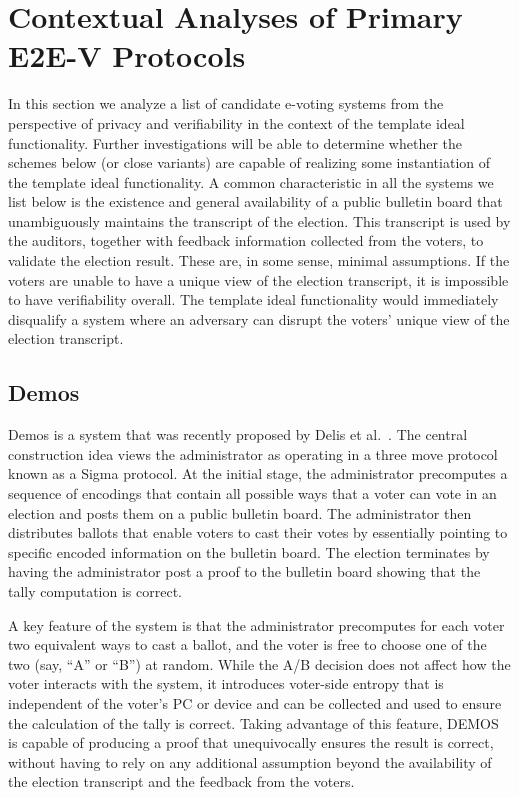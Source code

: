 \section{Contextual Analyses of Primary E2E-V Protocols}

In this section we analyze a list of candidate e-voting systems from
the perspective of privacy and verifiability in the context of the
template ideal functionality. Further investigations will be able to
determine whether the schemes below (or close variants) are capable of
realizing some instantiation of the template ideal functionality. A
common characteristic in all the systems we list below is the
existence and general availability of a public bulletin board that
unambiguously maintains the transcript of the election. This
transcript is used by the auditors, together with feedback information
collected from the voters, to validate the election result. These are,
in some sense, minimal assumptions. If the voters are unable to have a
unique view of the election transcript, it is impossible to have
verifiability overall. The template ideal functionality would
immediately disqualify a system where an adversary can disrupt the
voters' unique view of the election transcript.

\subsection{Demos}

Demos is a system that was recently proposed by Delis et
al.~\cite{kiayias2014}. The central construction idea views the
administrator as operating in a three move protocol known as a Sigma
protocol. At the initial stage, the administrator precomputes a
sequence of encodings that contain all possible ways that a voter can
vote in an election and posts them on a public bulletin board. The
administrator then distributes ballots that enable voters to cast
their votes by essentially pointing to specific encoded information on
the bulletin board. The election terminates by having the
administrator post a proof to the bulletin board showing that the
tally computation is correct.

A key feature of the system is that the administrator precomputes for
each voter two equivalent ways to cast a ballot, and the voter is free
to choose one of the two (say, ``A'' or ``B'') at random. While the
A/B decision does not affect how the voter interacts with the system,
it introduces voter-side entropy that is independent of the voter's PC
or device and can be collected and used to ensure the calculation of
the tally is correct. Taking advantage of this feature, DEMOS is
capable of producing a proof that unequivocally ensures the result is
correct, without having to rely on any additional assumption beyond
the availability of the election transcript and the feedback from the
voters.

